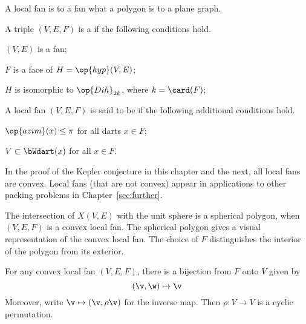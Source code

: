 A local fan is to a fan what a polygon is to a plane graph.  


\begin{definition} \label{def:convex-local}
A triple $(V,E,F)$ is a  if the following conditions hold.
\begin{description} 
\item {} $(V,E)$ is a fan;
\item {} $F$ is a face of $H = \op{hyp}(V,E)$;
\item {} $H$ is isomorphic to $\op{Dih}_{2k}$, where $k =
\card(F)$;
\end{description}
A local fan $(V,E,F)$ is said to be  if the following
additional conditions hold.
\begin{description}
\item {} $\op{azim}(x)\le \pi$ for all darts $x\in F$;
\item {} $V\subset \bWdart(x)$ for all $x\in F$.
\end{description}
\end{definition}
%

In the proof of the Kepler conjecture in this chapter and the next,
all local fans are convex.  Local fans (that are not convex) appear in
applications to other packing problems in Chapter~\ref{sec:further}.

\begin{remark}[visualization]
  The intersection of $X(V,E)$ with the unit sphere is a spherical
  polygon, when $(V,E,F)$ is a convex local fan.  The spherical
  polygon gives a visual representation of the convex local fan. The
  choice of $F$ distinguishes the interior of the polygon from its
  exterior.
\end{remark}


\begin{lemma}[]  
For any convex local fan $(V,E,F)$, there is a bijection from $F$ onto $V$
given by
\begin{displaymath}
(\v,\w) \mapsto \v
\end{displaymath}
Moreover, write $\v\mapsto(\v,\rho\v)$ for the inverse map. 
Then $\rho:V\to V$ is a cyclic permutation.
\end{lemma}
%

